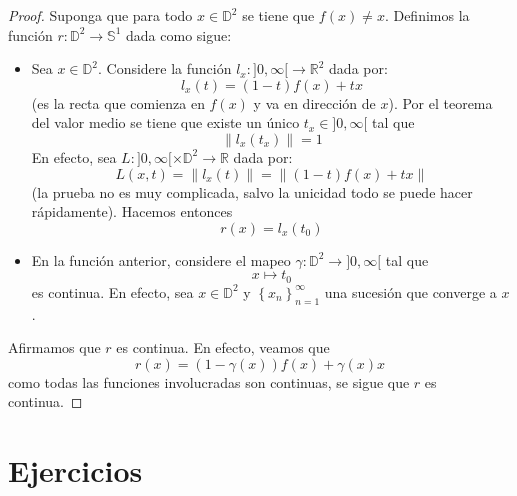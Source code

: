 \documentclass[12pt]{report}
\theoremstyle{largebreak}
\newcommand\cf[3]{\ensuremath{#1:#2\rightarrow#3}}
\begin{document}
    \begin{proof}
        Suponga que para todo $x\in\mathbb{D}^2$ se tiene que $f(x)\neq x$. Definimos la función $\cf{r}{\mathbb{D}^2}{\mathbb{S}^1}$ dada como sigue:
        \begin{itemize}
            \item Sea $x\in\mathbb{D}^2$. Considere la función $\cf{l_x}{]0,\infty[}{\mathbb{R}^2}$ dada por:
            \begin{equation*}
                l_x(t)=(1-t)f(x)+tx
            \end{equation*}
            (es la recta que comienza en $f(x)$ y va en dirección de $x$). Por el teorema del valor medio se tiene que existe un único $t_x\in]0,\infty[$ tal que
            \begin{equation*}
                \|l_x(t_x)\|=1
            \end{equation*}
            En efecto, sea $\cf{L}{]0,\infty[\times\mathbb{D}^2}{\mathbb{R}}$ dada por:
            \begin{equation*}
                L(x,t)=\|l_x(t)\|=\|(1-t)f(x)+tx\|
            \end{equation*}
            (la prueba no es muy complicada, salvo la unicidad todo se puede hacer rápidamente). Hacemos entonces
            \begin{equation*}
                r(x)=l_x(t_0)
            \end{equation*}
            \item En la función anterior, considere el mapeo $\cf{\gamma}{\mathbb{D}^2}{]0,\infty[}$ tal que
            \begin{equation*}
                x\mapsto t_0
            \end{equation*}
            es continua. En efecto, sea $x\in\mathbb{D}^2$ y $\left\{x_n \right\}_{ n=1}^{\infty}$ una sucesión que converge a $x$.
        \end{itemize}
        Afirmamos que $r$ es continua. En efecto, veamos que
        \begin{equation*}
            r(x)=(1-\gamma(x))f(x)+\gamma(x)x
        \end{equation*}
        como todas las funciones involucradas son continuas, se sigue que $r$ es continua.
    \end{proof}
    

    \newpage

    \section{Ejercicios}
\end{document}
